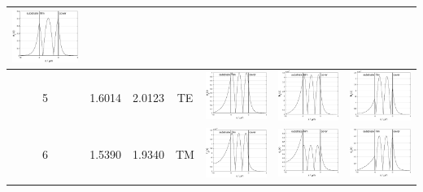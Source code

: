 \documentclass{assignment}
\begin{document}
\begin{sol}
\begin{itemize}
\begin{longtable}[c]{|c|c|c|c|c|c|c|}
      \includegraphics[width=.22\columnwidth]{Assignment-1-Problem-1-WaveGuide-2-ModalAnalysis-Mode-4-Ez.eps} \\ \hline
    5 &
      1.6014 &
      2.0123 &
      TE &
      \includegraphics[width=.22\columnwidth]{Assignment-1-Problem-1-WaveGuide-2-ModalAnalysis-Mode-5-Ey.eps} &
      \includegraphics[width=.22\columnwidth]{Assignment-1-Problem-1-WaveGuide-2-ModalAnalysis-Mode-5-Hx.eps} &
      \includegraphics[width=.22\columnwidth]{Assignment-1-Problem-1-WaveGuide-2-ModalAnalysis-Mode-5-Hz.eps} \\ \hline
    6 &
      1.5390 &
      1.9340 &
      TM &
      \includegraphics[width=.22\columnwidth]{Assignment-1-Problem-1-WaveGuide-2-ModalAnalysis-Mode-6-Hy.eps} &
      \includegraphics[width=.22\columnwidth]{Assignment-1-Problem-1-WaveGuide-2-ModalAnalysis-Mode-6-Ex.eps} &
      \includegraphics[width=.22\columnwidth]{Assignment-1-Problem-1-WaveGuide-2-ModalAnalysis-Mode-6-Ez.eps} \\ \hline
    \end{longtable}
    \end{itemize}
\end{sol}
\end{document}
